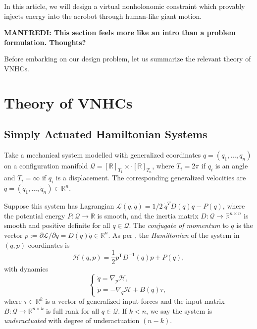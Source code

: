 \documentclass[journal,twoside,web]{ieeecolor}
\newcommand*{\tpose}{^\mathsf{T}}
\newcommand*{\inv}{^\mathsf{-1}}
\newcommand*{\Rt}[1]{[\R]_{#1}}
\newcommand*{\R}{\mathbb{R}}
\begin{document}
In this article, we will design a virtual
nonholonomic constraint which provably injects energy into the acrobot through 
human-like giant motion.

\textbf{MANFREDI: This section feels more like an intro than a problem
formulation. Thoughts?}

Before embarking on our design problem, let us summarize the relevant theory of
VNHCs.

\section{Theory of VNHCs}\label{sec:vnhc}

\subsection{Simply Actuated Hamiltonian Systems}
Take a mechanical system modelled with generalized coordinates 
\(q = (q_1, \ldots, q_n)\) on a configuration manifold
\(\mathcal{Q} = \Rt{T_1} \times \cdot \Rt{T_n}\), where
\(T_i = 2\pi\) if \(q_i\) is an angle and \(T_i = \infty\) if \(q_i\) is a
displacement. The corresponding generalized velocities are 
\(\dot{q} = (\dot{q}_1,\ldots,\dot{q}_n) \in \R^n\).

Suppose this system has Lagrangian
\(\mathcal{L}(q,\dot{q}) = 1/2~\dot{q}^T D(q) \dot{q} - P(q)\),
where the potential energy 
\(P : \mathcal{Q} \rightarrow \mathbb{R}\) 
is smooth, and the inertia matrix 
\(D : \mathcal{Q} \rightarrow \mathbb{R}^{n \times n}\)
is smooth and positive definite for all \(q \in \mathcal{Q}\).
The \textit{conjugate of momentum} to \(q\) is the vector
\(p := \partial\mathcal{L}/\partial\dot{q} = D(q) \dot{q} \in \R^n\).
As per \cite{landau_mechanics}, 
the \textit{Hamiltonian} of the system in \((q,p)\) coordinates
is
\begin{equation}\label{eqn:hamiltonian}
    \mathcal{H}(q,p) = \frac{1}{2} p\tpose D\inv(q) p + P(q)
    ,
\end{equation}
with dynamics
\begin{equation}\label{eqn:hamiltonian-eom-general}
    \begin{cases}
        \dot{q} = \nabla_p\mathcal{H} 
        , \\
        \dot{p} = -\nabla_q\mathcal{H} + B(q) \tau
        ,
    \end{cases}
\end{equation}
where \(\tau \in \R^k\) is a vector of generalized input forces and the input
matrix \(B : \mathcal{Q} \rightarrow \R^{n \times k}\) is full rank for all 
\(q \in \mathcal{Q}\).
If \(k < n\), we say the system is \textit{underactuated} with degree of
underactuation \((n-k)\).
\end{document}

